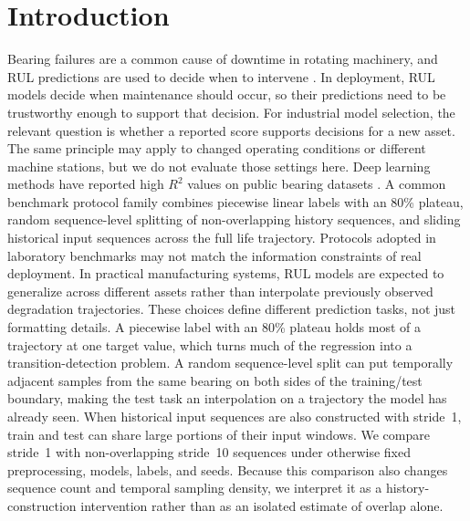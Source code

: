 \documentclass[pdflatex,sn-basic,NameDate]{sn-jnl}
\begin{document}
\section{Introduction}
Bearing failures are a common cause of downtime in rotating machinery, and RUL predictions are used to decide when to intervene \citep{lei2018machinery,zhao2019deep}. In deployment, RUL models decide when maintenance should occur, so their predictions need to be trustworthy enough to support that decision. For industrial model selection, the relevant question is whether a reported score supports decisions for a new asset. The same principle may apply to changed operating conditions or different machine stations, but we do not evaluate those settings here. Deep learning methods have reported high $R^2$ values on public bearing datasets \citep{rul_lstm_uq_2022,reg_lstm_2021,gru_tim_2021,transformer_tim_2023}. A common benchmark protocol family combines piecewise linear labels with an 80\% plateau, random sequence-level splitting of non-overlapping history sequences, and sliding historical input sequences across the full life trajectory. Protocols adopted in laboratory benchmarks may not match the information constraints of real deployment.
In practical manufacturing systems, RUL models are expected to generalize across different assets rather than interpolate previously observed degradation trajectories. These choices define different prediction tasks, not just formatting details. A piecewise label with an 80\% plateau holds most of a trajectory at one target value, which turns much of the regression into a transition-detection problem. A random sequence-level split can put temporally adjacent samples from the same bearing on both sides of the training/test boundary, making the test task an interpolation on a trajectory the model has already seen. When historical input sequences are also constructed with stride~1, train and test can share large portions of their input windows. We compare stride~1 with non-overlapping stride~10 sequences under otherwise fixed preprocessing, models, labels, and seeds. Because this comparison also changes sequence count and temporal sampling density, we interpret it as a history-construction intervention rather than as an isolated estimate of overlap alone.
\end{document}
